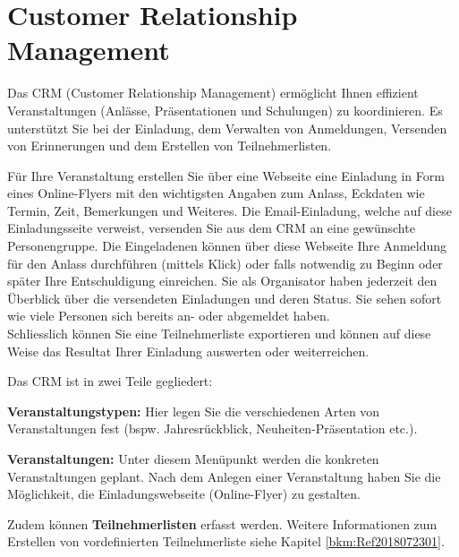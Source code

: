 
\clearpage
\section{Customer Relationship Management}

Das CRM (Customer Relationship Management) ermöglicht Ihnen effizient Veranstaltungen (Anlässe, Präsentationen und Schulungen) zu koordinieren. Es unterstützt Sie bei der Einladung, dem Verwalten von Anmeldungen, Versenden von Erinnerungen und dem Erstellen von Teilnehmerlisten.

\vspace{\baselineskip}

Für Ihre Veranstaltung erstellen Sie über eine Webseite eine Einladung in Form eines Online-Flyers mit den wichtigsten Angaben zum Anlass, Eckdaten wie Termin, Zeit, Bemerkungen und Weiteres. Die Email-Einladung, welche auf diese Einladungsseite verweist, versenden Sie aus dem CRM an eine gewünschte Personengruppe. Die Eingeladenen können über diese Webseite Ihre Anmeldung für den Anlass durchführen (mittels Klick) oder falls notwendig zu Beginn oder später Ihre Entschuldigung einreichen. Sie als Organisator haben jederzeit den Überblick über die versendeten Einladungen und deren Status. Sie sehen sofort wie viele Personen sich bereits an- oder abgemeldet haben. \\

Schliesslich können Sie eine Teilnehmerliste exportieren und können auf diese Weise das Resultat Ihrer Einladung auswerten oder weiterreichen.

\vspace{\baselineskip}

Das CRM ist in zwei Teile gegliedert: 
\begin{compactitem}
\item
\textbf{Veranstaltungstypen:} Hier legen Sie die verschiedenen Arten von Veranstaltungen fest (bspw. Jahresrückblick, Neuheiten-Präsentation etc.).
\item
\textbf{Veranstaltungen:} Unter diesem Menüpunkt werden die konkreten Veranstaltungen geplant. Nach dem Anlegen einer Veranstaltung haben Sie die Möglichkeit, die Einladungswebseite (Online-Flyer) zu gestalten.
\end{compactitem}

\vspace{\baselineskip}

Zudem können \textbf{Teilnehmerlisten} erfasst werden. Weitere Informationen zum Erstellen von vordefinierten Teilnehmerliste siehe Kapitel \ref{bkm:Ref2018072301}.

